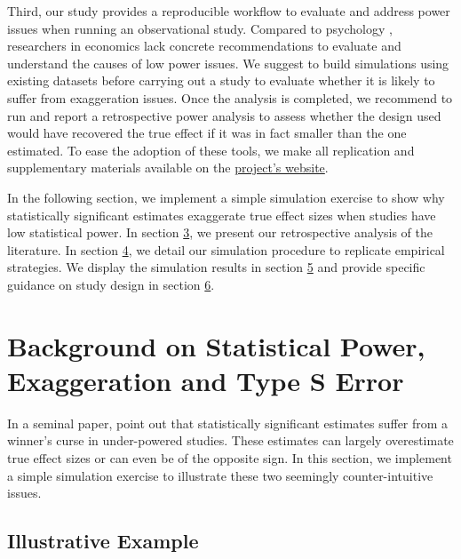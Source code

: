 \documentclass[12pt]{article}
\begin{document}
    Third, our study provides a reproducible workflow to evaluate and address power issues when running an observational study. Compared to psychology \citep{altoe_enhancing_2020}, researchers in economics lack concrete recommendations to evaluate and understand the causes of low power issues. We suggest to build simulations using existing datasets before carrying out a study to evaluate whether it is likely to suffer from exaggeration issues. Once the analysis is completed, we recommend to run and report a retrospective power analysis to assess whether the design used would have recovered the true effect if it was in fact smaller than the one estimated. To ease the adoption of these tools, we make all replication and supplementary materials available on the \href{https://vincentbagilet.github.io/inference_pollution/}{project's website}.

    In the following section, we implement a simple simulation exercise to show why statistically significant estimates exaggerate true effect sizes when studies have low statistical power. In section \hyperlink{section.3}{3}, we present our retrospective analysis of the literature. In section \hyperlink{section.4}{4}, we detail our simulation procedure to replicate empirical strategies. We display the simulation results in section \hyperlink{section.5}{5} and provide specific guidance on study design in section \hyperlink{section.6}{6}.
    




\section{Background on Statistical Power, Exaggeration and Type S Error}

    In a seminal paper, \cite{gelman_beyond_2014} point out that statistically significant estimates suffer from a winner's curse in under-powered studies. These estimates can largely overestimate true effect sizes or can even be of the opposite sign. In this section, we implement a simple simulation exercise to illustrate these two seemingly counter-intuitive issues. 

    \subsection{Illustrative Example}
    
\end{document}
